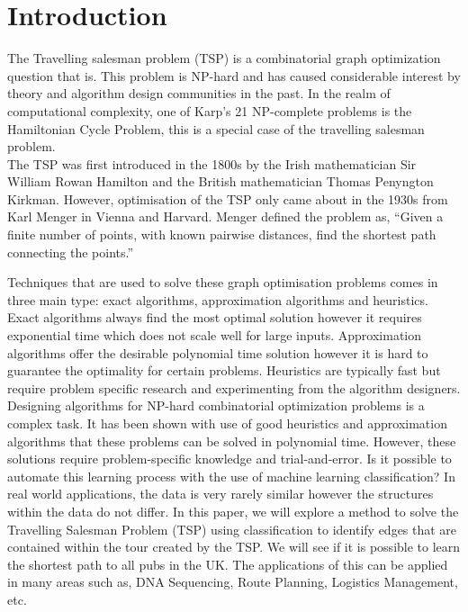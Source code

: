 \documentclass[]{UCD_CS_FYP_Report}
\begin{document}
\chapter{Introduction}
The Travelling salesman problem (TSP) is a combinatorial graph optimization question that is. This problem is NP-hard and has caused considerable interest by theory and algorithm design communities in the past. In the realm of computational complexity, one of Karp's 21 NP-complete problems is the Hamiltonian Cycle Problem, this is a special case of the travelling salesman problem.\\[0.2cm] 
The TSP was first introduced in the 1800s by the Irish mathematician Sir William Rowan Hamilton and the British mathematician Thomas Penyngton Kirkman. However, optimisation of the TSP only came about in the 1930s from Karl Menger in Vienna and Harvard. Menger defined the problem as, “Given a finite number of points, with known pairwise distances, find the shortest path connecting the points.”\cite{Menger}

Techniques that are used to solve these graph optimisation problems comes in three main type: exact algorithms, approximation algorithms and heuristics. Exact algorithms always find the most optimal solution however it requires exponential time which does not scale well for large inputs. Approximation algorithms offer the desirable polynomial time solution however it is hard to guarantee the optimality for certain problems. Heuristics are typically fast but require problem specific research and experimenting from the algorithm designers.\\[0.2cm]
Designing algorithms for NP-hard combinatorial optimization problems is a complex task. It has been shown with use of good heuristics and approximation algorithms that these problems can be solved in polynomial time. However, these solutions require problem-specific knowledge and trial-and-error. Is it possible to automate this learning process with the use of machine learning classification? In real world applications, the data is very rarely similar however the structures within the data do not differ. In this paper, we will explore a method to solve the Travelling Salesman Problem (TSP) using classification to identify edges that are contained within the tour created by the TSP. We will see if it is possible to learn the shortest path to all pubs in the UK. The applications of this can be applied in many areas such as, DNA Sequencing, Route Planning, Logistics Management, etc.
\end{document}
